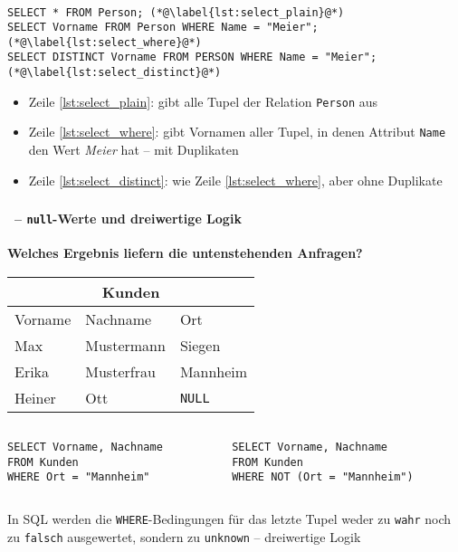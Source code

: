 \begin{frame}[fragile]\frametitle{\insertsection}
	\framesubtitle{\insertsubsection}
\\[4pt]
		\begin{lstlisting}[xleftmargin=3ex]
SELECT * FROM Person; (*@\label{lst:select_plain}@*)
SELECT Vorname FROM Person WHERE Name = "Meier"; (*@\label{lst:select_where}@*)
SELECT DISTINCT Vorname FROM PERSON WHERE Name = "Meier"; (*@\label{lst:select_distinct}@*)
		\end{lstlisting}
\begin{itemize}
	\item Zeile \ref{lst:select_plain}: gibt alle Tupel der Relation \texttt{Person} aus
	\pause
	\item Zeile \ref{lst:select_where}: gibt Vornamen aller Tupel, in denen Attribut 
	\texttt{Name} den Wert \textit{Meier} hat -- mit Duplikaten
	\pause
	\item Zeile \ref{lst:select_distinct}: wie Zeile \ref{lst:select_where}, aber	ohne Duplikate
	\end{itemize}
\end{frame}

\begin{frame}[fragile]\frametitle{\insertsection}
\framesubtitle{\insertsubsection\ -- \texttt{null}-Werte und dreiwertige Logik}
\textbf{Welches Ergebnis liefern die untenstehenden Anfragen?}
\begin{table}
	\centering
	\footnotesize
	\begin{tabular}{lll}\toprule
		\multicolumn{3}{c}{\textbf{Kunden}}\\\midrule
		Vorname & Nachname & Ort \\\midrule
		Max & Mustermann & Siegen \\
		Erika & Musterfrau & Mannheim \\
		Heiner & Ott & \texttt{NULL} \\\bottomrule
	\end{tabular}
\end{table}
\begin{columns}
\begin{column}{.28\textwidth}
\begin{lstlisting}[xleftmargin=2ex]
SELECT Vorname, Nachname
FROM Kunden
WHERE Ort = "Mannheim"
\end{lstlisting}
\end{column}
\begin{column}{.28\textwidth}
\begin{lstlisting}[xleftmargin=2ex]
SELECT Vorname, Nachname
FROM Kunden
WHERE NOT (Ort = "Mannheim")
\end{lstlisting}
\end{column}
\end{columns}
\pause
In SQL werden die \texttt{WHERE}-Bedingungen f\"ur das  
letzte Tupel weder zu \texttt{wahr} noch zu \texttt{falsch} ausgewertet, sondern zu 
\texttt{unknown} -- dreiwertige Logik
\end{frame}

